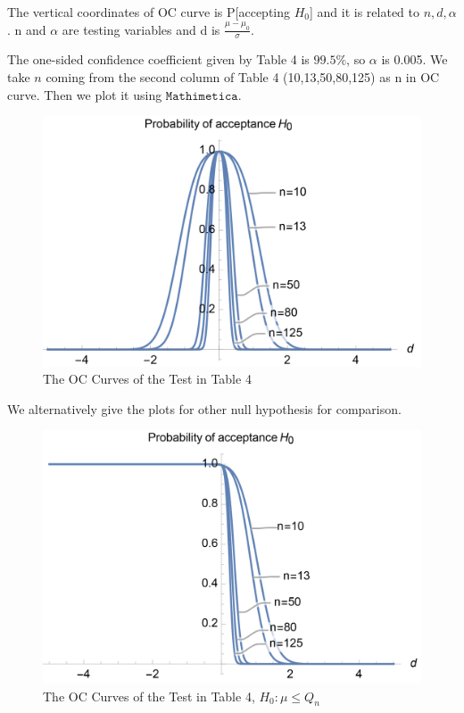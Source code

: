 \documentclass[a4paper]{article}
\begin{document}
The vertical coordinates of OC curve is P[accepting $H_0$] and it is related to $n, d, \alpha$. n and $\alpha$ are testing variables and d is $\displaystyle\frac{\mu-\mu_0}{\sigma}$.

The one-sided confidence coefficient given by Table 4 is $99.5\%$, so $\alpha$ is 0.005. We take $n$ coming from the second column of Table 4 (10,13,50,80,125) as n in OC curve. Then we plot it using $\texttt{Mathimetica}$.

\begin{figure}[!htbp] 
\centering 
\includegraphics[width=0.8\linewidth]{occurve1.png}  
\caption{The OC Curves of the Test in Table 4} 
\label{fig1}
\end{figure}

\newpage

We alternatively give the plots for other null hypothesis for comparison.

\begin{figure}[!htbp] 
\centering 
\includegraphics[width=0.8\linewidth]{occurve2.png}  
\caption{The OC Curves of the Test in Table 4, $H_0: \mu\leq Q_n$} 
\label{fig1}
\end{figure}
\end{document}
